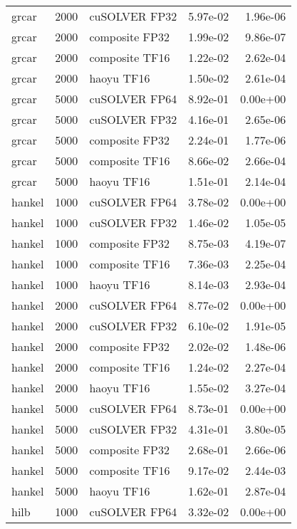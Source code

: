 \begin{table}
\begin{tabular}{lrlrr}
    grcar &  2000 &  cuSOLVER FP32 &  5.97e-02 &        1.96e-06 \\
    grcar &  2000 & composite FP32 &  1.99e-02 &        9.86e-07 \\
    grcar &  2000 & composite TF16 &  1.22e-02 &        2.62e-04 \\
    grcar &  2000 &     haoyu TF16 &  1.50e-02 &        2.61e-04 \\
    grcar &  5000 &  cuSOLVER FP64 &  8.92e-01 &        0.00e+00 \\
    grcar &  5000 &  cuSOLVER FP32 &  4.16e-01 &        2.65e-06 \\
    grcar &  5000 & composite FP32 &  2.24e-01 &        1.77e-06 \\
    grcar &  5000 & composite TF16 &  8.66e-02 &        2.66e-04 \\
    grcar &  5000 &     haoyu TF16 &  1.51e-01 &        2.14e-04 \\
   hankel &  1000 &  cuSOLVER FP64 &  3.78e-02 &        0.00e+00 \\
   hankel &  1000 &  cuSOLVER FP32 &  1.46e-02 &        1.05e-05 \\
   hankel &  1000 & composite FP32 &  8.75e-03 &        4.19e-07 \\
   hankel &  1000 & composite TF16 &  7.36e-03 &        2.25e-04 \\
   hankel &  1000 &     haoyu TF16 &  8.14e-03 &        2.93e-04 \\
   hankel &  2000 &  cuSOLVER FP64 &  8.77e-02 &        0.00e+00 \\
   hankel &  2000 &  cuSOLVER FP32 &  6.10e-02 &        1.91e-05 \\
   hankel &  2000 & composite FP32 &  2.02e-02 &        1.48e-06 \\
   hankel &  2000 & composite TF16 &  1.24e-02 &        2.27e-04 \\
   hankel &  2000 &     haoyu TF16 &  1.55e-02 &        3.27e-04 \\
   hankel &  5000 &  cuSOLVER FP64 &  8.73e-01 &        0.00e+00 \\
   hankel &  5000 &  cuSOLVER FP32 &  4.31e-01 &        3.80e-05 \\
   hankel &  5000 & composite FP32 &  2.68e-01 &        2.66e-06 \\
   hankel &  5000 & composite TF16 &  9.17e-02 &        2.44e-03 \\
   hankel &  5000 &     haoyu TF16 &  1.62e-01 &        2.87e-04 \\
     hilb &  1000 &  cuSOLVER FP64 &  3.32e-02 &        0.00e+00 \\

\end{tabular}
\end{table}
